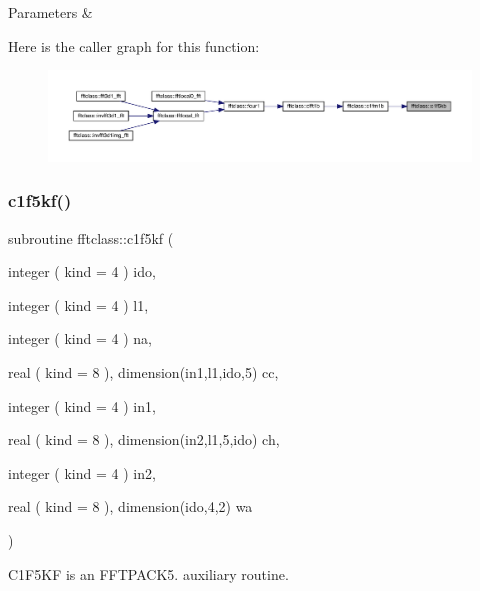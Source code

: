 \begin{DoxyParams}{Parameters}
{\em } & \\
\hline
\end{DoxyParams}
Here is the caller graph for this function\+:\nopagebreak
\begin{figure}[H]
\begin{center}
\leavevmode
\includegraphics[width=350pt]{namespacefftclass_aa356856107611ad66966fed70ede74f1_icgraph}
\end{center}
\end{figure}
\mbox{\label{namespacefftclass_a21d2647f4c2392ed5498288f99a3203c}} 
\subsubsection{\texorpdfstring{c1f5kf()}{c1f5kf()}}
{\footnotesize\ttfamily subroutine fftclass\+::c1f5kf (\begin{DoxyParamCaption}\item[{integer ( kind = 4 )}]{ido,  }\item[{integer ( kind = 4 )}]{l1,  }\item[{integer ( kind = 4 )}]{na,  }\item[{real ( kind = 8 ), dimension(in1,l1,ido,5)}]{cc,  }\item[{integer ( kind = 4 )}]{in1,  }\item[{real ( kind = 8 ), dimension(in2,l1,5,ido)}]{ch,  }\item[{integer ( kind = 4 )}]{in2,  }\item[{real ( kind = 8 ), dimension(ido,4,2)}]{wa }\end{DoxyParamCaption})}



C1\+F5\+KF is an F\+F\+T\+P\+A\+C\+K5. auxiliary routine. 

